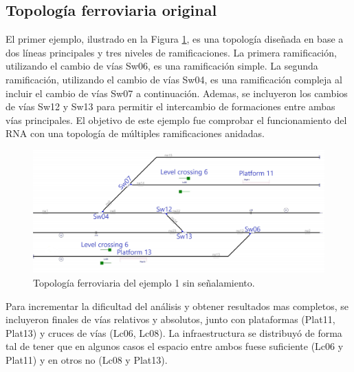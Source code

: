 \subsection{Topología ferroviaria original}

	El primer ejemplo, ilustrado en la Figura \ref{fig:EJ1_1}, es una topología diseñada en base a dos líneas principales y tres niveles de ramificaciones. La primera ramificación, utilizando el cambio de vías Sw06, es una ramificación simple. La segunda ramificación, utilizando el cambio de vías Sw04, es una ramificación compleja al incluir el cambio de vías Sw07 a continuación. Ademas, se incluyeron los cambios de vías Sw12 y Sw13 para permitir el intercambio de formaciones entre ambas vías principales. El objetivo de este ejemplo fue comprobar el funcionamiento del RNA con una topología de múltiples ramificaciones anidadas.
	
	\begin{figure}[h]
		\centering
		\includegraphics[width=1\textwidth]{resultados-obtenidos/ejemplo1/images/1_empty.png}
		\centering\caption{Topología ferroviaria del ejemplo 1 sin señalamiento.}
		\label{fig:EJ1_1}
	\end{figure}
	
	Para incrementar la dificultad del análisis y obtener resultados mas completos, se incluyeron finales de vías relativos y absolutos, junto con plataformas (Plat11, Plat13) y cruces de vías (Lc06, Lc08). La infraestructura se distribuyó de forma tal de tener que en algunos casos el espacio entre ambos fuese suficiente (Lc06 y Plat11) y en otros no (Lc08 y Plat13).